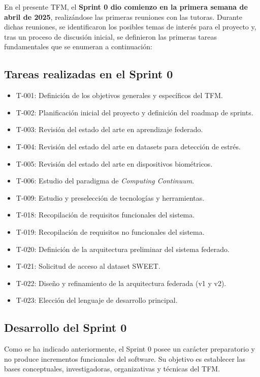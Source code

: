 \documentclass{report}
\begin{document}
En el presente TFM, el \textbf{Sprint 0 dio comienzo en la primera semana de abril de 2025}, realizándose las primeras reuniones con las tutoras. 
Durante dichas reuniones, se identificaron los posibles temas de interés para el proyecto y, tras un proceso de discusión inicial, se definieron las primeras tareas fundamentales que se enumeran a continuación:  

\subsection{Tareas realizadas en el Sprint 0}

\begin{itemize}
    \item T-001: Definición de los objetivos generales y específicos del TFM.
    \item T-002: Planificación inicial del proyecto y definición del roadmap de sprints.
    \item T-003: Revisión del estado del arte en aprendizaje federado.
    \item T-004: Revisión del estado del arte en datasets para detección de estrés.
    \item T-005: Revisión del estado del arte en dispositivos biométricos.
    \item T-006: Estudio del paradigma de \textit{Computing Continuum}.
    \item T-009: Estudio y preselección de tecnologías y herramientas.
    \item T-018: Recopilación de requisitos funcionales del sistema.
    \item T-019: Recopilación de requisitos no funcionales del sistema.
    \item T-020: Definición de la arquitectura preliminar del sistema federado.
    \item T-021: Solicitud de acceso al dataset SWEET.
    \item T-022: Diseño y refinamiento de la arquitectura federada (v1 y v2).
    \item T-023: Elección del lenguaje de desarrollo principal.
\end{itemize}
\subsection{Desarrollo del Sprint 0}

Como se ha indicado anteriormente, el Sprint 0 posee un carácter preparatorio y no produce incrementos funcionales del software. Su objetivo es establecer las bases conceptuales, investigadoras, organizativas y técnicas del TFM.
\end{document}
